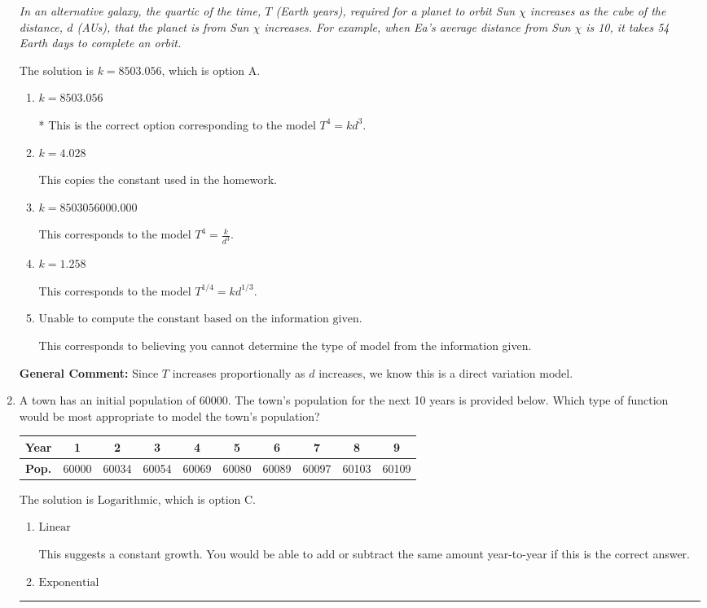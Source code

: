\documentclass{extbook}[14pt]
\newcommand{\litem}[1]{\item #1

\rule{\textwidth}{0.4pt}}
\begin{document}
\begin{enumerate}
{\begin{center}
    \textit{ In an alternative galaxy, the quartic of the time, $T$ (Earth years), required for a planet to orbit Sun $\chi$ increases as the cube of the distance, $d$ (AUs), that the planet is from Sun $\chi$ increases. For example, when Ea's average distance from Sun $\chi$ is 10, it takes 54 Earth days to complete an orbit. }
\end{center}


The solution is \( k = 8503.056 \), which is option A.\begin{enumerate}[label=\Alph*.]
\item \( k = 8503.056 \)

* This is the correct option corresponding to the model $T^{4} = k d^{3}$.
\item \( k = 4.028 \)

This copies the constant used in the homework.
\item \( k = 8503056000.000 \)

This corresponds to the model $T^{4} = \frac{k}{d^{3}}$.
\item \( k = 1.258 \)

This corresponds to the model $T^{1/4} = k d^{1/3}$.
\item \( \text{Unable to compute the constant based on the information given.} \)

This corresponds to believing you cannot determine the type of model from the information given.
\end{enumerate}

\textbf{General Comment:} Since $T$ increases proportionally as $d$ increases, we know this is a direct variation model.
}
\litem{
A town has an initial population of 60000. The town's population for the next 10 years is provided below. Which type of function would be most appropriate to model the town's population?



\begin{tabular}{c|c|c|c|c|c|c|c|c|c}
\textbf{Year} & 1 & 2 & 3 & 4 & 5 & 6 & 7 & 8 & 9 \tabularnewline
\hline
\textbf{Pop.} & 60000 & 60034 & 60054 & 60069 & 60080 & 60089 & 60097 & 60103 & 60109
\end{tabular} 

The solution is \( \text{Logarithmic} \), which is option C.\begin{enumerate}[label=\Alph*.]
\item \( \text{Linear} \)

This suggests a constant growth. You would be able to add or subtract the same amount year-to-year if this is the correct answer.
\item \( \text{Exponential} \)


\end{enumerate}}
\end{enumerate}
\end{document}
